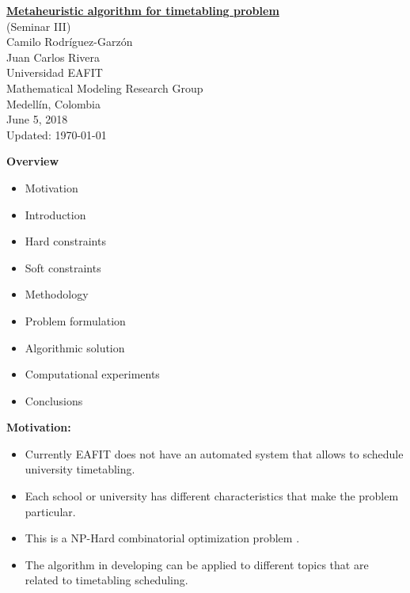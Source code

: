 \documentclass[centering]{report}
\newenvironment{slide}
    {\newpage
    \vspace*{\fill}
    }
    { 
     \vspace*{\fill}
    }
\begin{document}
\Huge %

\setcounter{chapter}{1}
\setcounter{section}{1}

\newpage
\thispagestyle{empty}
\vspace*{\fill}
\begin{center}
  {\Huge{\underline{\textbf{Metaheuristic algorithm for timetabling problem}}}} \\[4mm]
  {\Huge{(Seminar III)}} \\[10mm]
  {\Huge{Camilo Rodríguez-Garzón}} \\
  {\Huge{Juan Carlos Rivera}} \\[20mm]
  {\Huge Universidad EAFIT}\\
  {\Huge Mathematical Modeling Research Group}\\[10mm]
  {\Huge Medellín, Colombia}\\[10mm]
  {\Huge June 5, 2018}\\
  {\LARGE\color{gray} Updated: \today}
\end{center}
\vspace*{\fill}

\begin{slide}
\textbf{Overview}\\
\begin{itemize}
    \item Motivation
    \item Introduction
    \item Hard constraints
    \item Soft constraints
    \item Methodology
    \item Problem formulation
    \item Algorithmic solution
    \item Computational experiments
    \item Conclusions
\end{itemize}
\end{slide}

\begin{slide}
\textbf{Motivation:}\\

\begin{itemize} 
\item Currently EAFIT does not have an automated system that allows to schedule university timetabling.
\item Each school or university has different characteristics that make the problem particular.
\item This is a NP-Hard combinatorial optimization problem \cite {Abdelhalim2016}.
\item The algorithm in developing can be applied to different topics that are related to timetabling scheduling.
\end{itemize}

\end{slide}
\end{document}
